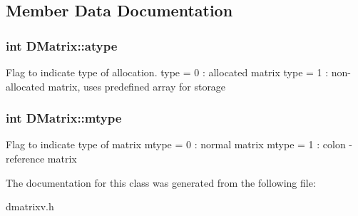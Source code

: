 \subsection{Member Data Documentation}
\hypertarget{classDMatrix_a7d862f142821d27ff3ca0620170428ba}{
\subsubsection[{atype}]{\setlength{\rightskip}{0pt plus 5cm}int {\bf DMatrix::atype}}}
\label{classDMatrix_a7d862f142821d27ff3ca0620170428ba}
Flag to indicate type of allocation. type = 0 : allocated matrix type = 1 : non-\/allocated matrix, uses predefined array for storage \hypertarget{classDMatrix_a1b72a6547b064c5e262e5db9389b34f4}{
\subsubsection[{mtype}]{\setlength{\rightskip}{0pt plus 5cm}int {\bf DMatrix::mtype}}}
\label{classDMatrix_a1b72a6547b064c5e262e5db9389b34f4}
Flag to indicate type of matrix mtype = 0 : normal matrix mtype = 1 : colon -\/ reference matrix 

The documentation for this class was generated from the following file:\begin{DoxyCompactItemize}
\item 
dmatrixv.h\end{DoxyCompactItemize}
